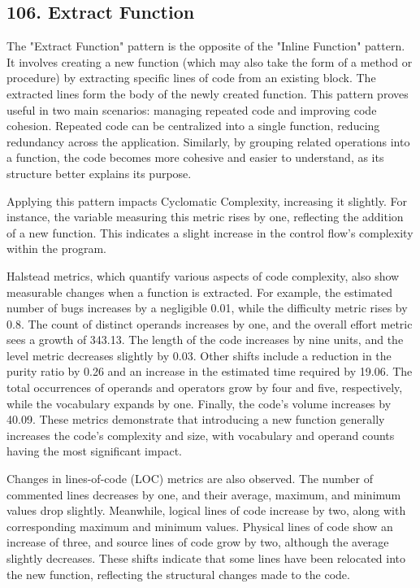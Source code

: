 \subsection{106. Extract Function}

The "Extract Function" pattern is the opposite of the "Inline Function" pattern. It involves creating a new function (which may also take the form of a method or procedure) by extracting specific lines of code from an existing block. The extracted lines form the body of the newly created function. This pattern proves useful in two main scenarios: managing repeated code and improving code cohesion. Repeated code can be centralized into a single function, reducing redundancy across the application. Similarly, by grouping related operations into a function, the code becomes more cohesive and easier to understand, as its structure better explains its purpose.

Applying this pattern impacts Cyclomatic Complexity, increasing it slightly. For instance, the variable measuring this metric rises by one, reflecting the addition of a new function. This indicates a slight increase in the control flow's complexity within the program.

Halstead metrics, which quantify various aspects of code complexity, also show measurable changes when a function is extracted. For example, the estimated number of bugs increases by a negligible 0.01, while the difficulty metric rises by 0.8. The count of distinct operands increases by one, and the overall effort metric sees a growth of 343.13. The length of the code increases by nine units, and the level metric decreases slightly by 0.03. Other shifts include a reduction in the purity ratio by 0.26 and an increase in the estimated time required by 19.06. The total occurrences of operands and operators grow by four and five, respectively, while the vocabulary expands by one. Finally, the code's volume increases by 40.09. These metrics demonstrate that introducing a new function generally increases the code's complexity and size, with vocabulary and operand counts having the most significant impact.

Changes in lines-of-code (LOC) metrics are also observed. The number of commented lines decreases by one, and their average, maximum, and minimum values drop slightly. Meanwhile, logical lines of code increase by two, along with corresponding maximum and minimum values. Physical lines of code show an increase of three, and source lines of code grow by two, although the average slightly decreases. These shifts indicate that some lines have been relocated into the new function, reflecting the structural changes made to the code.

